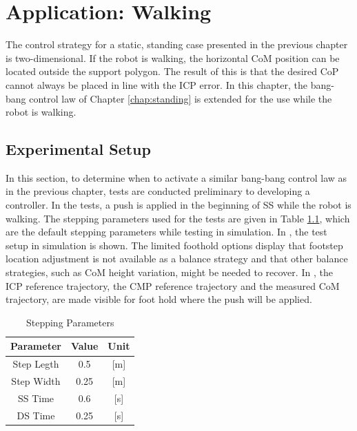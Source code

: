 %
\chapter{Application: Walking}\label{chap:walking}
The control strategy for a static, standing case presented in the previous chapter is two-dimensional. If the robot is walking, the horizontal \ac{CoM} position can be located outside the support polygon. The result of this is that the desired \ac{CoP} cannot always be placed in line with the \ac{ICP} error.  In this chapter, the bang-bang control law of Chapter \ref{chap:standing} is extended for the use while the robot is walking.
\section{Experimental Setup}
In this section, to determine when to activate a similar bang-bang control law as in the previous chapter,  tests are conducted preliminary to developing a controller. In the tests, a push is applied in the beginning of \ac{SS} while the robot is walking. The stepping parameters used for the tests are given in Table \ref{tab:stepping}, which are the default stepping parameters while testing in simulation. In , the test setup in simulation is shown. The limited foothold options display that footstep location adjustment is not available as a balance strategy and that other balance strategies, such as \ac{CoM} height variation, might be needed to recover. In , the \ac{ICP} reference trajectory, the \ac{CMP} reference trajectory and the measured \ac{CoM} trajectory, are made visible for foot hold where the push will be applied. 
\begin{table}
\caption{Stepping Parameters} %
\centering %
\begin{tabular}{c c c } %
\hline\hline %
Parameter & Value & Unit \\
\hline %
Step Legth & 0.5 &  [m]\\
Step Width & 0.25 & [m]\\
\acs{SS} Time & 0.6 & [s]\\
\acs{DS} Time & 0.25 & [s]\\
\hline %
\end{tabular}
\label{tab:stepping} %
\end{table}

